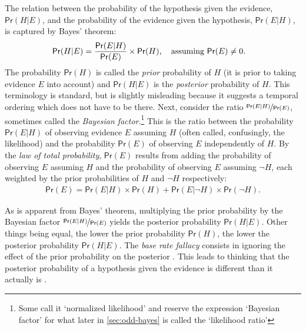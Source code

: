 \documentclass{article}
\newcommand{\pr}{\mathsf{Pr}}
\begin{document}
The relation between the probability of the hypothesis given the evidence, $\pr(H \vert E)$, and the probability of the evidence given the hypothesis, $\pr(E \vert H)$, is captured by   Bayes' theorem:
%
\begin{align*}\pr(H \vert E) & =  \frac{\pr(E \vert H)}{\pr(E)} \times \pr(H)\mbox{, \,\,\, assuming } \pr(E) \neq 0.\end{align*}
%
The probability $\pr(H)$ is called the \textit{prior} probability of $H$ (it is prior to taking  evidence $E$ into account) and $\pr(H\vert E)$ is the \emph{posterior} probability of $H$. This terminology is standard, but is slightly misleading because it suggests  a temporal ordering which does not have to be there. Next, consider the ratio $\nicefrac{\pr(E \vert H)}{\pr(E)} $, sometimes called the \textit{Bayesian factor}.\footnote{Some call it `normalized likelihood' and reserve the expression `Bayesian factor' for what later in \ref{sec:odd-bayes} is called the `likelihood ratio'} This is the ratio between the probability $\pr(E \vert H)$ of observing evidence $E$ assuming $H$ (often called, confusingly, the likelihood) and the probability $\pr(E)$ of observing $E$ independently of $H$. 
%
By the \emph{law of total probability}, $\pr(E)$ results from adding  the probability of observing $E$ assuming $H$  and the probability of  observing $E$ assuming $\neg H$, each weighted by the prior probabilities of $H$ and $\neg H$ respectively:  
%
\begin{align*}\pr(E)= \pr(E \vert H)\times \pr(H)+\pr(E \vert \neg H)\times \pr(\neg H).\end{align*}
%

 As is apparent from Bayes' theorem, multiplying the prior probability by the Bayesian factor $\nicefrac{\pr(E \vert H)}{\pr(E)}$  yields the posterior probability $\pr(H \vert E)$. 
Other things being equal, the lower the prior probability $\pr(H)$, the lower the posterior probability $\pr(H \vert E)$.
%
%
%
The \textit{base rate fallacy} consists in ignoring the effect of the prior probability on the posterior \citep{Kahneman1973}.
%
This leads to thinking that the posterior probability of a hypothesis given the evidence is different than it actually is  \citep{KoehlerBaseRate}. 
\end{document}
